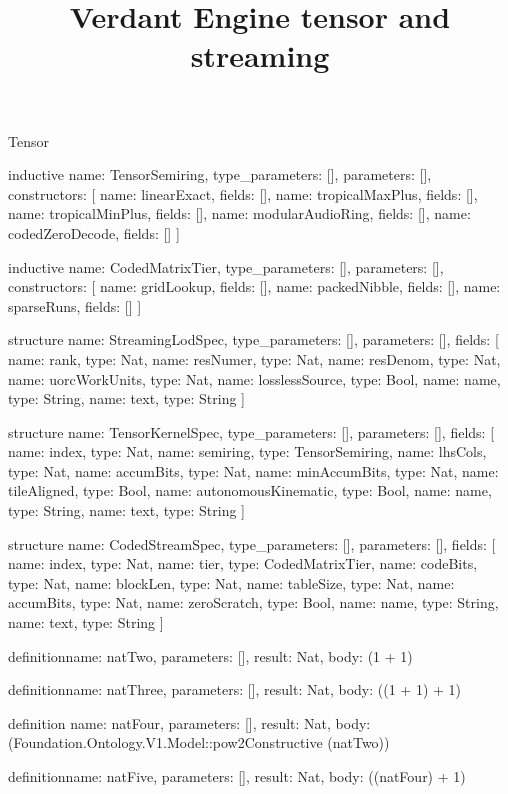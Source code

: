 \begin{lexlean}{Tensor}
\title{Verdant Engine tensor and streaming}
\begin{semanticmodule}
inductive{
  name: TensorSemiring,
  type_parameters: [],
  parameters: [],
  constructors: [
    {name: linearExact, fields: []},
    {name: tropicalMaxPlus, fields: []},
    {name: tropicalMinPlus, fields: []},
    {name: modularAudioRing, fields: []},
    {name: codedZeroDecode, fields: []}
  ]
}

inductive{
  name: CodedMatrixTier,
  type_parameters: [],
  parameters: [],
  constructors: [
    {name: gridLookup, fields: []},
    {name: packedNibble, fields: []},
    {name: sparseRuns, fields: []}
  ]
}

structure{
  name: StreamingLodSpec,
  type_parameters: [],
  parameters: [],
  fields: [
    {name: rank, type: Nat},
    {name: resNumer, type: Nat},
    {name: resDenom, type: Nat},
    {name: uorcWorkUnits, type: Nat},
    {name: losslessSource, type: Bool},
    {name: name, type: String},
    {name: text, type: String}
  ]
}

structure{
  name: TensorKernelSpec,
  type_parameters: [],
  parameters: [],
  fields: [
    {name: index, type: Nat},
    {name: semiring, type: TensorSemiring},
    {name: lhsCols, type: Nat},
    {name: accumBits, type: Nat},
    {name: minAccumBits, type: Nat},
    {name: tileAligned, type: Bool},
    {name: autonomousKinematic, type: Bool},
    {name: name, type: String},
    {name: text, type: String}
  ]
}

structure{
  name: CodedStreamSpec,
  type_parameters: [],
  parameters: [],
  fields: [
    {name: index, type: Nat},
    {name: tier, type: CodedMatrixTier},
    {name: codeBits, type: Nat},
    {name: blockLen, type: Nat},
    {name: tableSize, type: Nat},
    {name: accumBits, type: Nat},
    {name: zeroScratch, type: Bool},
    {name: name, type: String},
    {name: text, type: String}
  ]
}

definition{name: natTwo, parameters: [], result: Nat, body: (1 + 1)}

definition{name: natThree, parameters: [], result: Nat, body: ((1 + 1) + 1)}

definition{
  name: natFour,
  parameters: [],
  result: Nat,
  body: (Foundation.Ontology.V1.Model::pow2Constructive (natTwo))
}

definition{name: natFive, parameters: [], result: Nat, body: ((natFour) + 1)}


\end{semanticmodule}
\end{lexlean}
